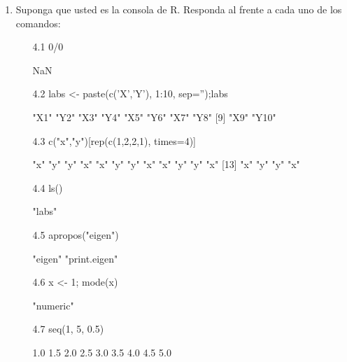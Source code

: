 \documentclass[letterpaper, 12pt]{article}
\begin{document}
\begin{enumerate}
\item Suponga que usted es la consola de R. Responda al frente a cada uno
de los comandos:
\begin{enumerate}
\item[4.1] 0/0

\begin{Schunk}
\begin{Soutput}
[1] NaN
\end{Soutput}
\end{Schunk}

\item[4.2] labs <- paste(c('X','Y'), 1:10, sep='');labs

\begin{Schunk}
\begin{Soutput}
 [1] "X1"  "Y2"  "X3"  "Y4"  "X5"  "Y6"  "X7"  "Y8" 
 [9] "X9"  "Y10"
\end{Soutput}
\end{Schunk}

\item[4.3] c("x","y")[rep(c(1,2,2,1), times=4)]

\begin{Schunk}
\begin{Soutput}
 [1] "x" "y" "y" "x" "x" "y" "y" "x" "x" "y" "y" "x"
[13] "x" "y" "y" "x"
\end{Soutput}
\end{Schunk}

\item[4.4] ls()

\begin{Schunk}
\begin{Soutput}
[1] "labs"
\end{Soutput}
\end{Schunk}

\item[4.5] apropos("eigen")

\begin{Schunk}
\begin{Soutput}
[1] "eigen"       "print.eigen"
\end{Soutput}
\end{Schunk}

\item[4.6] x <- 1; mode(x)
\begin{Schunk}
\begin{Soutput}
[1] "numeric"
\end{Soutput}
\end{Schunk}

\item[4.7] seq(1, 5, 0.5)
\begin{Schunk}
\begin{Soutput}
[1] 1.0 1.5 2.0 2.5 3.0 3.5 4.0 4.5 5.0
\end{Soutput}
\end{Schunk}


\end{enumerate}
\end{enumerate}
\end{document}

